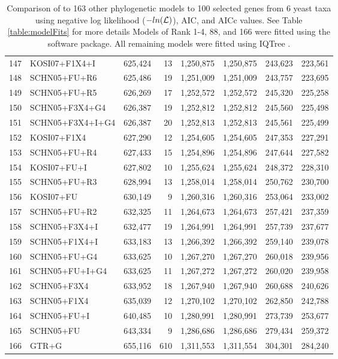 \begin{table}
\begin{longtable}{rlrrrrrr}
147&KOSI07+F1X4+I&625,424&13&1,250,875&1,250,875&243,623&223,561\\
148&SCHN05+FU+R6&625,486&19&1,251,009&1,251,009&243,757&223,695\\
149&SCHN05+FU+R5&626,269&17&1,252,572&1,252,572&245,320&225,258\\
150&SCHN05+F3X4+G4&626,387&19&1,252,812&1,252,812&245,560&225,498\\
151&SCHN05+F3X4+I+G4&626,387&20&1,252,813&1,252,813&245,561&225,499\\
152&KOSI07+F1X4&627,290&12&1,254,605&1,254,605&247,353&227,291\\
153&SCHN05+FU+R4&627,433&15&1,254,896&1,254,896&247,644&227,582\\
154&KOSI07+FU+I&627,802&10&1,255,624&1,255,624&248,372&228,310\\
155&SCHN05+FU+R3&628,994&13&1,258,014&1,258,014&250,762&230,700\\
156&KOSI07+FU&630,149&9&1,260,316&1,260,316&253,064&233,002\\
157&SCHN05+FU+R2&632,325&11&1,264,673&1,264,673&257,421&237,359\\
158&SCHN05+F3X4+I&632,477&19&1,264,991&1,264,991&257,739&237,677\\
159&SCHN05+F1X4+I&633,183&13&1,266,392&1,266,392&259,140&239,078\\
160&SCHN05+FU+G4&633,625&10&1,267,270&1,267,270&260,018&239,956\\
161&SCHN05+FU+I+G4&633,625&11&1,267,272&1,267,272&260,020&239,958\\
162&SCHN05+F3X4&633,952&18&1,267,940&1,267,940&260,688&240,626\\
163&SCHN05+F1X4&635,039&12&1,270,102&1,270,102&262,850&242,788\\
164&SCHN05+FU+I&640,485&10&1,280,991&1,280,991&273,739&253,677\\
165&SCHN05+FU&643,334&9&1,286,686&1,286,686&279,434&259,372\\
166&GTR+G&655,116&610&1,311,553&1,311,554&304,301&284,240
\end{longtable}
\caption{Comparison of \selac to 163 other phylogenetic models to 100 selected genes from 6 yeast taxa \citet{SalichosAndRokas2013} using negative log likelihood ($-ln(\mathcal{L})$), AIC, and AICc values.
See Table \ref{table:modelFits} for more details
Models of Rank 1-4, 88, and 166 were fitted using the \selac software package.  All remaining models were fitted using IQTree \citep{IQTree}.}\label{table:modelFitsAll}
\end{table}

